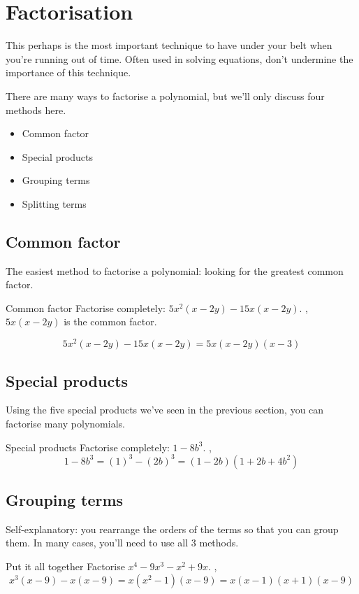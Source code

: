 \documentclass[../../main.tex]{subfiles}
\begin{document}
\section{Factorisation}
This perhaps is the most important technique to have under your belt when you're running out of time. Often used in solving equations, don't undermine the importance of this technique.

There are many ways to factorise a polynomial, but we'll only discuss four methods here.
\begin{itemize}
    \item Common factor
    \item Special products
    \item Grouping terms
    \item Splitting terms
\end{itemize}


\subsection{Common factor}

The easiest method to factorise a polynomial: looking for the greatest common factor.
\begin{example}{Common factor}
Factorise completely: $5x^{2}(x-2y)-15x(x-2y)$.
\sep
$5x(x-2y)$ is the common factor.

\[ 5x^{2}(x-2y)-15x(x-2y)=5x(x-2y)(x-3) \]
\end{example}

\subsection{Special products}

Using the five special products we've seen in the previous section, you can factorise many polynomials.
\begin{example}{Special products}
Factorise completely: $1-8b^{3}$.
\sep
\[ 1-8b^{3}=(1)^{3}-(2b)^{3}=(1-2b)\left(1+2b+4b^{2}\right) \]
\end{example}

\subsection{Grouping terms}

Self-explanatory: you rearrange the orders of the terms so that you can group them. In many cases, you'll need to use all 3 methods.
\begin{example}{Put it all together}
Factorise $x^{4}-9x^{3}-x^{2}+9x$.
\sep
\[ x^{3}(x-9)-x(x-9)=x\left(x^{2}-1\right)(x-9)=x(x-1)(x+1)(x-9) \]
\end{example}
\end{document}
